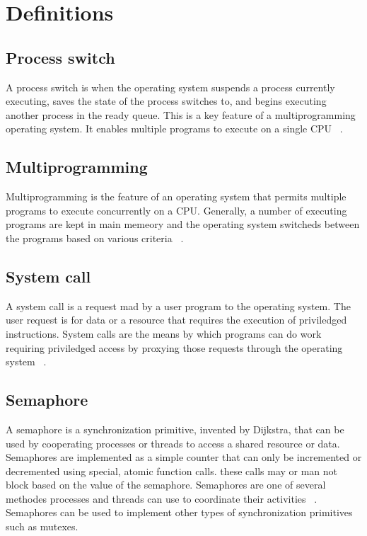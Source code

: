 \documentclass[12pt]{article}
\date{\today}
\begin{document}
\maketitle

\section*{Definitions}
\subsection*{Process switch}
A process switch is when the operating system suspends a process
currently executing, saves the state of the process switches to, and
begins executing another process in the ready queue.  This is a key
feature of a multiprogramming operating system.  It enables multiple
programs to execute on a single CPU ~\cite{stallings}.

\subsection*{Multiprogramming}
Multiprogramming is the feature of an operating system that permits
multiple programs to execute concurrently on a CPU. Generally, a
number of executing programs are kept in main memeory and the
operating system switcheds between the programs based on various
criteria ~\cite{stallings}.

\subsection*{System call}
A system call is a request mad by a user program to the operating
system.  The user request is for data or a resource that requires the
execution of priviledged instructions.  System calls are the means by
which programs can do work requiring priviledged access by proxying
those requests through the operating system ~\cite{stallings}.

\subsection*{Semaphore}
A semaphore is a synchronization primitive, invented by Dijkstra, that
can be used by cooperating processes or threads to access a shared
resource or data.  Semaphores are implemented as a simple counter that
can only be incremented or decremented using special, atomic function
calls.  these calls may or man not block based on the value of the
semaphore.  Semaphores are one of several methodes processes and
threads can use to coordinate their activities ~\cite{stallings}.
Semaphores can be used to implement other types of synchronization
primitives such as mutexes.
\end{document}
